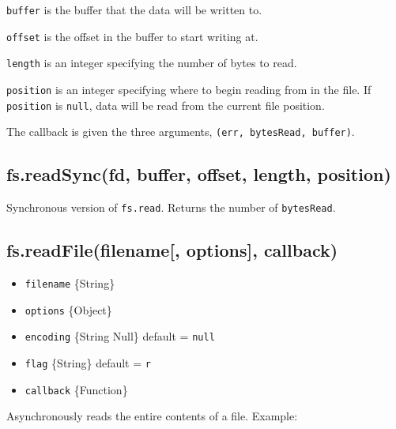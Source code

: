 \texttt{buffer} is the buffer that the data will be written to.

\texttt{offset} is the offset in the buffer to start writing at.

\texttt{length} is an integer specifying the number of bytes to read.

\texttt{position} is an integer specifying where to begin reading from
in the file. If \texttt{position} is \texttt{null}, data will be read
from the current file position.

The callback is given the three arguments,
\texttt{(err,\ bytesRead,\ buffer)}.

\subsection{fs.readSync(fd, buffer, offset, length,
position)}\label{fs.readsyncfd-buffer-offset-length-position}

Synchronous version of \texttt{fs.read}. Returns the number of
\texttt{bytesRead}.

\subsection{fs.readFile(filename{[}, options{]},
callback)}\label{fs.readfilefilename-options-callback}

\begin{itemize}
\itemsep1pt\parskip0pt
\item
  \texttt{filename} \{String\}
\item
  \texttt{options} \{Object\}
\item
  \texttt{encoding} \{String \textbar{} Null\} default = \texttt{null}
\item
  \texttt{flag} \{String\} default =
  \texttt{\textquotesingle{}r\textquotesingle{}}
\item
  \texttt{callback} \{Function\}
\end{itemize}

Asynchronously reads the entire contents of a file. Example:

\begin{Shaded}
\begin{Highlighting}[]
\NormalTok{(}\NormalTok{, } 
    
\NormalTok{\});}
\end{Highlighting}
\end{Shaded}

